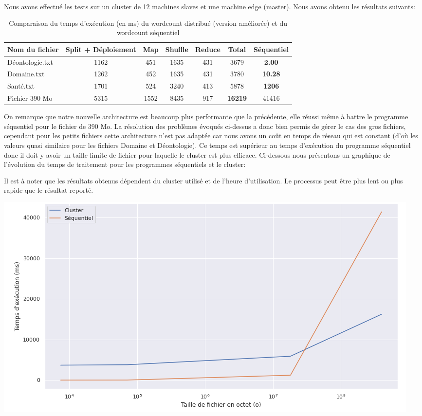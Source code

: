\documentclass{article}
\begin{document}
Nous avons effectué les tests sur un cluster de 12 machines slaves et une machine edge (master). Nous avons obtenu les résultats suivants:
\begin{table}[h!]
    \begin{center}
        \begin{tabular}{| l || c | c | c | c | c || c |}
            \hline			
              \textbf{Nom du fichier} & \textbf{Split + Déploiement} & \textbf{Map} & \textbf{Shuffle} & \textbf{Reduce} & \textbf{Total} & \textbf{Séquentiel}\\ \hline
              Déontologie.txt & 1162 & 451 & 1635 & 431 & 3679 & \textbf{2.00}\\ \hline
              Domaine.txt & 1262 & 452 & 1635 & 431 & 3780 & \textbf{10.28}\\ \hline
              Santé.txt & 1701 & 524 & 3240 & 413 & 5878 & \textbf{1206}\\ \hline
              Fichier 390 Mo & 5315 & 1552 & 8435 & 917 & \textbf{16219} & 41416\\ \hline
        \end{tabular}
    \end{center}
    \caption{Comparaison du temps d'exécution (en ms) du wordcount distribué (version améliorée) et du wordcount séquentiel}
\end{table}


On remarque que notre nouvelle architecture est beaucoup plus performante que la précédente, elle réussi même à battre le programme séquentiel pour le 
fichier de 390 Mo. La résolution des problèmes évoqués ci-dessus a donc bien permis de gérer le cas des gros fichiers, cependant pour les petits fichiers cette architecture n'est pas 
adaptée car nous avons un coût en temps de réseau qui est constant (d'où les valeurs quasi similaire pour les fichiers Domaine et Déontologie). Ce temps est supérieur au temps d'exécution du programme séquentiel
donc il doit y avoir un taille limite de fichier pour laquelle le cluster est plus efficace. Ci-dessous nous présentons un graphique de l'évolution du temps de traitement pour les programmes séquentiels et le cluster:


Il est à noter que les résultats obtenus dépendent du cluster utilisé et de l'heure d'utilisation. Le processus peut être plus lent ou plus rapide que le résultat reporté.
\begin{center}
    \includegraphics[scale=0.5]{img/graph.png}
\end{center}
\end{document}
